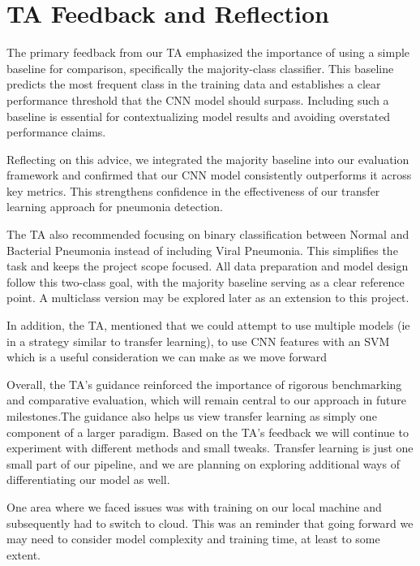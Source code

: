 \documentclass[11pt]{article}
\begin{document}

\section{TA Feedback and Reflection}
The primary feedback from our TA emphasized the importance of using a simple baseline for comparison, specifically the majority-class classifier. This baseline predicts the most frequent class in the training data and establishes a clear performance threshold that the CNN model should surpass. Including such a baseline is essential for contextualizing model results and avoiding overstated performance claims.

Reflecting on this advice, we integrated the majority baseline into our evaluation framework and confirmed that our CNN model consistently outperforms it across key metrics. This strengthens confidence in the effectiveness of our transfer learning approach for pneumonia detection.

The TA also recommended focusing on binary classification between Normal and Bacterial Pneumonia instead of including Viral Pneumonia. This simplifies the task and keeps the project scope focused. All data preparation and model design follow this two-class goal, with the majority baseline serving as a clear reference point. A multiclass version may be explored later as an extension to this project.

In addition, the TA, mentioned that we could attempt to use multiple models (ie in a strategy similar to transfer learning), to use CNN features with an SVM which is a useful consideration we can make as we move forward

Overall, the TA’s guidance reinforced the importance of rigorous benchmarking and comparative evaluation, which will remain central to our approach in future milestones.The guidance also helps us view transfer learning as simply one component of a larger paradigm. Based on the TA's feedback we will continue to experiment with different methods and small tweaks. Transfer learning is just one small part of our pipeline, and we are planning on exploring additional ways of differentiating our model as well.

One area where we faced issues was with training on our local machine and subsequently had to switch to cloud. This was an reminder that going forward we may need to consider model complexity and training time, at least to some extent.
\end{document}
